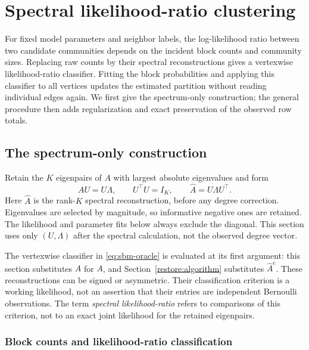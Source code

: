 \section{Spectral likelihood-ratio clustering}\label{sec:algorithm}

For fixed model parameters and neighbor labels, the log-likelihood ratio
between two candidate communities depends on the incident block counts
and community sizes. Replacing raw counts by their spectral reconstructions
gives a vertexwise likelihood-ratio classifier. Fitting the block
probabilities and applying this classifier to all vertices updates the
estimated partition without reading individual edges again. We first
give the spectrum-only construction; the general procedure then adds
regularization and exact preservation of the observed row totals.

\subsection{The spectrum-only construction}\label{sec:simple}

Retain the $K$ eigenpairs of $A$ with largest absolute eigenvalues and
form
\[
 AU=U\Lambda,\qquad U^\top U=I_K,\qquad \widehat A=U\Lambda U^\top.
\]
Here $\widehat A$ is the rank-$K$ spectral reconstruction, before
any degree correction. Eigenvalues are selected by magnitude, so
informative negative ones are retained. The likelihood and parameter
fits below always exclude the diagonal. This section uses only
$(U,\Lambda)$ after the spectral calculation, not the observed
degree vector.

The vertexwise classifier in \eqref{eq:sbm-oracle} is evaluated at
its first argument: this section substitutes $\widehat A$ for $A$,
and Section~\ref{restore:algorithm} substitutes $\widehat A^{\mathrm{c}}$.
These reconstructions can be signed or asymmetric. Their classification
criterion is a working likelihood, not an assertion that their entries
are independent Bernoulli observations. The term \emph{spectral
likelihood-ratio} refers to comparisons of this criterion, not to an
exact joint likelihood for the retained eigenpairs.

\subsubsection{Block counts and likelihood-ratio classification}

